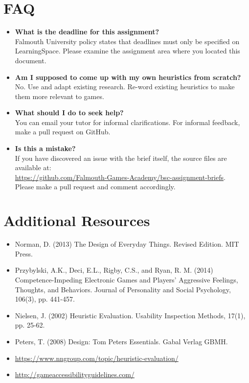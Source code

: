 \documentclass{../fal_assignment}
\begin{document}
\section*{FAQ}

\begin{itemize}
	\item 	\textbf{What is the deadline for this assignment?} \\ 
    		Falmouth University policy states that deadlines must only be specified on LearningSpace. Please examine the assignment area where you located this document.
    		
    	\item 	\textbf{Am I supposed to come up with my own heuristics from scratch?} \\ 
    		No. Use and adapt existing research. Re-word existing heuristics to make them more relevant to games.	
    		
	\item 	\textbf{What should I do to seek help?} \\ 
    		You can email your tutor for informal clarifications. For informal feedback, make a pull request on GitHub. 
    		
    	\item 	\textbf{Is this a mistake?} \\ 	
    		If you have discovered an issue with the brief itself, the source files are available at: \\
    		\url{https://github.com/Falmouth-Games-Academy/bsc-assignment-briefs}.\\
    		 Please make a pull request and comment accordingly.
\end{itemize}

\section*{Additional Resources}

\begin{itemize}
    \item Norman, D. (2013) The Design of Everyday Things. Revised Edition. MIT Press.
    \item Przybylski, A.K., Deci, E.L., Rigby, C.S., and Ryan, R. M. (2014) Competence-Impeding Electronic Games and Players' Aggressive Feelings, Thoughts, and Behaviors. Journal of Personality and Social Psychology, 106(3), pp. 441-457.
    \item Nielsen, J. (2002) Heuristic Evaluation. Usability Inspection Methods, 17(1), pp. 25-62. 
    \item Peters, T. (2008) Design: Tom Peters Essentials. Gabal Verlag GBMH.
    \item \url{https://www.nngroup.com/topic/heuristic-evaluation/}
    \item \url{http://gameaccessibilityguidelines.com/}
\end{itemize}
\end{document}
